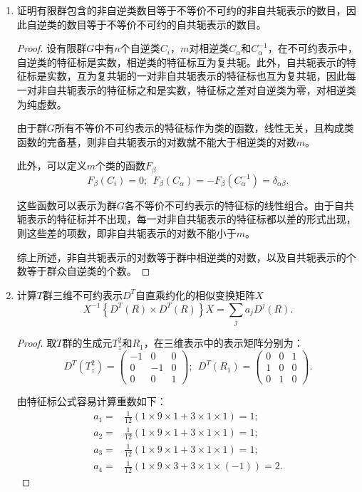 \documentclass[reqno,a4paper,12pt]{amsart}
\begin{document}
\begin{enumerate}[1.]
\medskip

\item 证明有限群包含的非自逆类数目等于不等价不可约的非自共轭表示的数目，因此自逆类的数目等于不等价不可约的自共轭表示的数目。

\begin{proof}
设有限群$G$中有$n$个自逆类$C_i$，$m$对相逆类$C_\alpha$和$C_\alpha^{-1}$，在不可约表示中，自逆类的特征标是实数，相逆类的特征标互为复共轭。此外，自共轭表示的特征标是实数，互为复共轭的一对非自共轭表示的特征标也互为复共轭，因此每一对非自共轭表示的特征标之和是实数，特征标之差对自逆类为零，对相逆类为纯虚数。

由于群$G$所有不等价不可约表示的特征标作为类的函数，线性无关，且构成类函数的完备基，则非自共轭表示的对数就不能大于相逆类的对数$m$。

此外，可以定义$m$个类的函数$F_\beta$
\[
	F_\beta(C_i) = 0; \ \ F_\beta(C_\alpha) = -F_\beta(C_\alpha^{-1}) = \delta_{\alpha\beta}.
\]

这些函数可以表示为群$G$各不等价不可约表示的特征标的线性组合。由于自共轭表示的特征标并不出现，每一对非自共轭表示的特征标都以差的形式出现，则这些差的项数，即非自共轭表示的对数不能小于$m$。

综上所述，非自共轭表示的对数等于群中相逆类的对数，以及自共轭表示的个数等于群众自逆类的个数。
\end{proof}

\medskip

\item 计算$T$群三维不可约表示$D^T$自直乘约化的相似变换矩阵$X$
\[
	X^{-1} \left\{ D^T(R) \times D^T(R) \right\} X = \sum_{j} a_j D^j(R).
\]

\begin{proof}
取$T$群的生成元$T_z^2$和$R_1$，在三维表示中的表示矩阵分别为：
\[
	D^T(T_z^2) = \left( \begin{matrix}
		-1 & 0 & 0 \\
		0 & -1 & 0 \\
		0 & 0 & 1
	\end{matrix} \right); \ \ 
	D^T(R_1) = \left( \begin{matrix}
		0 & 0 & 1 \\
		1 & 0 & 0 \\
		0 & 1 & 0
	\end{matrix} \right).
\]

由特征标公式容易计算重数如下：
\begin{align*}
	a_1 =& \frac{1}{12}(1\times9\times1 + 3\times1\times1) = 1; \\
	a_2 =& \frac{1}{12}(1\times9\times1 + 3\times1\times1) = 1; \\
	a_3 =& \frac{1}{12}(1\times9\times1 + 3\times1\times1) = 1; \\
	a_4 =& \frac{1}{12}(1\times9\times3+3\times1\times(-1))= 2.
\end{align*}


\end{proof}
\end{enumerate}
\end{document}
